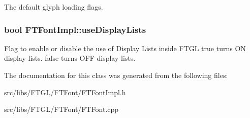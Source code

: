 The default glyph loading flags. \hypertarget{class_f_t_font_impl_a5c21ea909477c7180b86625fef6af457}{
\subsubsection[{useDisplayLists}]{\setlength{\rightskip}{0pt plus 5cm}bool {\bf FTFontImpl::useDisplayLists}}}
\label{class_f_t_font_impl_a5c21ea909477c7180b86625fef6af457}
Flag to enable or disable the use of Display Lists inside FTGL {\ttfamily true} turns ON display lists. {\ttfamily false} turns OFF display lists. 

The documentation for this class was generated from the following files:\begin{DoxyCompactItemize}
\item 
src/libs/FTGL/FTFont/FTFontImpl.h\item 
src/libs/FTGL/FTFont/FTFont.cpp\end{DoxyCompactItemize}
